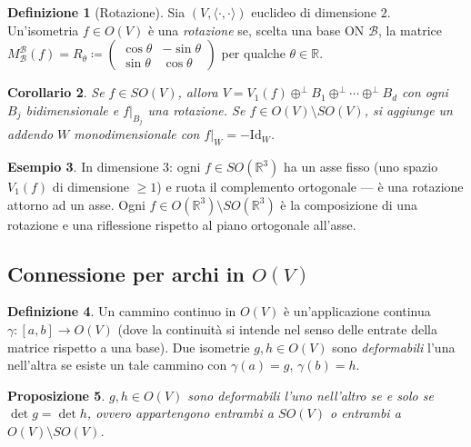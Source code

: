 \documentclass[11pt, a4paper]{book}
\theoremstyle{definition}
\newtheorem{definizione}{Definizione}[section]
\newtheorem{esempio}[definizione]{Esempio}
\theoremstyle{plain}
\newtheorem{proposizione}[definizione]{Proposizione}
\newtheorem{corollario}[definizione]{Corollario}
\theoremstyle{remark}
\newcommand{\R}{\mathbb{R}}
\newcommand{\Id}{\mathrm{Id}}
\begin{document}
\begin{defbox}
\begin{definizione}[Rotazione]
Sia $(V,\langle\cdot,\cdot\rangle)$ euclideo di dimensione $2$. Un'isometria $f \in O(V)$ è una \emph{rotazione} se, scelta una base ON $\mathcal{B}$, la matrice $M^{\mathcal{B}}_{\mathcal{B}}(f) = R_\theta \coloneqq \begin{pmatrix}\cos\theta & -\sin\theta\\\sin\theta & \cos\theta\end{pmatrix}$ per qualche $\theta \in \R$.
\end{definizione}
\end{defbox}

\begin{corollario}
\label{cor:so-decomp}
Se $f \in SO(V)$, allora $V = V_1(f) \oplus^\perp B_1 \oplus^\perp \cdots \oplus^\perp B_d$ con ogni $B_j$ bidimensionale e $f|_{B_j}$ una rotazione. Se $f \in O(V) \setminus SO(V)$, si aggiunge un addendo $W$ monodimensionale con $f|_W = -\Id_W$.
\end{corollario}

\begin{exbox}
\begin{esempio}
In dimensione $3$: ogni $f \in SO(\R^3)$ ha un asse fisso (uno spazio $V_1(f)$ di dimensione $\geq 1$) e ruota il complemento ortogonale — è una rotazione attorno ad un asse. Ogni $f \in O(\R^3) \setminus SO(\R^3)$ è la composizione di una rotazione e una riflessione rispetto al piano ortogonale all'asse.
\end{esempio}
\end{exbox}

\subsection{Connessione per archi in $O(V)$}

\begin{defbox}
\begin{definizione}
Un cammino continuo in $O(V)$ è un'applicazione continua $\gamma \colon [a,b] \to O(V)$ (dove la continuità si intende nel senso delle entrate della matrice rispetto a una base). Due isometrie $g,h \in O(V)$ sono \emph{deformabili} l'una nell'altra se esiste un tale cammino con $\gamma(a)=g$, $\gamma(b)=h$.
\end{definizione}
\end{defbox}

\begin{proposizione}
\label{prop:connessione-O}
$g,h \in O(V)$ sono deformabili l'uno nell'altro se e solo se $\det g = \det h$, ovvero appartengono entrambi a $SO(V)$ o entrambi a $O(V)\setminus SO(V)$.
\end{proposizione}
\end{document}
